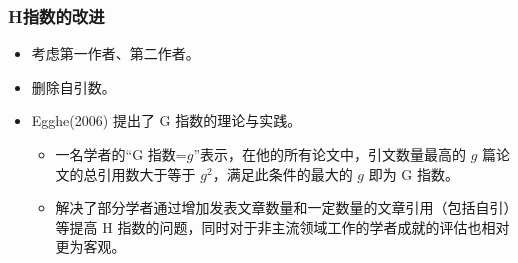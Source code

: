\documentclass[11pt,compress,t, xcolor=table]{beamer}
\begin{document}
\begin{frame}
	\frametitle{H指数的改进}
	\begin{itemize}	
		\item 考虑第一作者、第二作者。
		\smallskip
		\item 删除自引数。
		\smallskip
		\item \textcolor{TsinghuaPurple}{Egghe(2006)} 提出了 G 指数的理论与实践。
		\smallskip
		\begin{itemize}	
			\item 一名学者的“G 指数=$g$”表示，在他的所有论文中，引文数量最高的 $g$ 篇论文的总引用数大于等于 $g^2$，满足此条件的最大的 $g$ 即为 G 指数。
			\smallskip	
			\item 解决了部分学者通过增加发表文章数量和一定数量的文章引用（包括自引）等提高 H 指数的问题，同时对于非主流领域工作的学者成就的评估也相对更为客观。
		\end{itemize}
	\end{itemize}
	
\end{frame}



		
	

		
\end{document}
